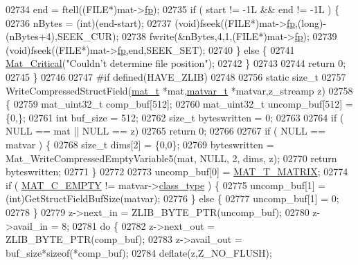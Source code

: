 \begin{DoxyCode}
{{{{{{{{{{{{{{{{02734     end = ftell((FILE*)mat->\hyperlink{struct__mat__t_a85f562e407ca9ad4d2a6e14f839432b7}{fp});
02735     \textcolor{keywordflow}{if} ( start != -1L && end != -1L ) \{
02736         nBytes = (int)(end-start);
02737         (void)fseek((FILE*)mat->\hyperlink{struct__mat__t_a85f562e407ca9ad4d2a6e14f839432b7}{fp},(long)-(nBytes+4),SEEK\_CUR);
02738         fwrite(&nBytes,4,1,(FILE*)mat->\hyperlink{struct__mat__t_a85f562e407ca9ad4d2a6e14f839432b7}{fp});
02739         (void)fseek((FILE*)mat->\hyperlink{struct__mat__t_a85f562e407ca9ad4d2a6e14f839432b7}{fp},end,SEEK\_SET);
02740     \} \textcolor{keywordflow}{else} \{
02741         \hyperlink{group__mat__util_gaf51f2bfbb5580f575e4dd79757e2b80c}{Mat\_Critical}(\textcolor{stringliteral}{"Couldn't determine file position"});
02742     \}
02743 
02744     \textcolor{keywordflow}{return} 0;
02745 \}
02746 
02747 \textcolor{preprocessor}{#if defined(HAVE\_ZLIB)}
02748 
02756 \textcolor{keyword}{static} \textcolor{keywordtype}{size\_t}
02757 WriteCompressedStructField(\hyperlink{struct__mat__t}{mat\_t} *mat,\hyperlink{group___m_a_t_structmatvar__t}{matvar\_t} *matvar,z\_streamp z)
02758 \{
02759     mat\_uint32\_t comp\_buf[512];
02760     mat\_uint32\_t uncomp\_buf[512] = \{0,\};
02761     \textcolor{keywordtype}{int} buf\_size = 512;
02762     \textcolor{keywordtype}{size\_t} byteswritten = 0;
02763 
02764     \textcolor{keywordflow}{if} ( NULL == mat || NULL == z)
02765         \textcolor{keywordflow}{return} 0;
02766 
02767     \textcolor{keywordflow}{if} ( NULL == matvar ) \{
02768         \textcolor{keywordtype}{size\_t} dims[2] = \{0,0\};
02769         byteswritten = Mat\_WriteCompressedEmptyVariable5(mat, NULL, 2, dims, z);
02770         \textcolor{keywordflow}{return} byteswritten;
02771     \}
02772 
02773     uncomp\_buf[0] = \hyperlink{group___m_a_t_ggacf7b3b879282b7ab3a51190e49bf3453a32985fee89a4df8db4b3f5d3a48823d3}{MAT\_T\_MATRIX};
02774     \textcolor{keywordflow}{if} ( \hyperlink{group___m_a_t_ggad4d60ae7b709fc81bfd744fb4c857c40a5c76eef0ca0373d25abe49053be6fa9a}{MAT\_C\_EMPTY} != matvar->\hyperlink{group___m_a_t_aff13035bf3265dd7d9425e5d40c839d4}{class\_type} ) \{
02775         uncomp\_buf[1] = (int)GetStructFieldBufSize(matvar);
02776     \} \textcolor{keywordflow}{else} \{
02777         uncomp\_buf[1] = 0;
02778     \}
02779     z->next\_in  = ZLIB\_BYTE\_PTR(uncomp\_buf);
02780     z->avail\_in = 8;
02781     \textcolor{keywordflow}{do} \{
02782         z->next\_out  = ZLIB\_BYTE\_PTR(comp\_buf);
02783         z->avail\_out = buf\_size*\textcolor{keyword}{sizeof}(*comp\_buf);
02784         deflate(z,Z\_NO\_FLUSH);
}}}}}}}}}}}}}}}}
\end{DoxyCode}
